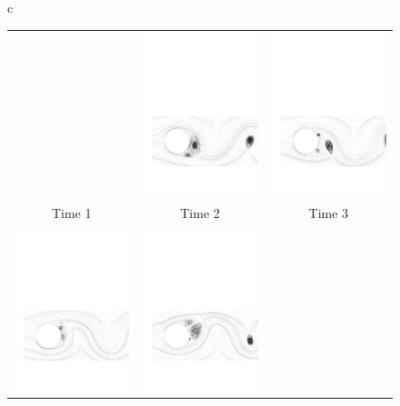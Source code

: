 \begin{figure}[ht]
\begin{center}
\begin{tabular}{c}
{\begin{tabular}{ccc}
         &
         \includegraphics[width=45mm,clip=t]{CHAP_NONLIN/FIGURE/cim3.pdf}
         &
         \includegraphics[width=45mm,clip=t]{CHAP_NONLIN/FIGURE/cim4.pdf}
        \\
         Time 1 & Time 2 & Time 3
        \\
         \includegraphics[width=45mm,clip=t]{CHAP_NONLIN/FIGURE/cim5.pdf}
         &
         \includegraphics[width=45mm,clip=t]{CHAP_NONLIN/FIGURE/cim6.pdf}

\end{tabular}}
\end{tabular}
\end{center}
\end{figure}
